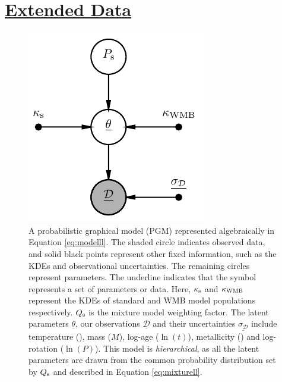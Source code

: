 \clearpage 
\section*{\underline{Extended Data}}

\setcounter{figure}{0}    

\begin{figure}[h!]
	\centering
	\includegraphics[width=0.6 \textwidth]{pgm_models.pdf}
	\caption{A probabilistic graphical model (PGM) represented algebraically in Equation \ref{eq:modelll}. The shaded circle indicates observed data, and solid black points represent other fixed information, such as the KDEs and observational uncertainties. The remaining circles represent parameters. The underline indicates that the symbol represents a set of parameters or data. Here, $\kappa_{\rm{s}}$ and $\kappa_{\rm WMB}$ represent the KDEs of standard and WMB model populations respectively. $Q_{\rm{s}}$ is the mixture model weighting factor. The latent parameters $\underline{\theta}$, our observations $\underline{\mathcal{D}}$ and their uncertainties $\underline{\sigma_{\mathcal{D}}}$ include temperature (\teff), mass ($M$), log-age ($\ln(t)$), metallicity (\feh) and log-rotation ($\ln(P)$). This model is \textit{hierarchical}, as all the latent parameters are drawn from the common probability distribution set by $Q_{\rm{s}}$ and described in Equation \ref{eq:mixturell}.}
	\label{fig:pgm}
\end{figure}

